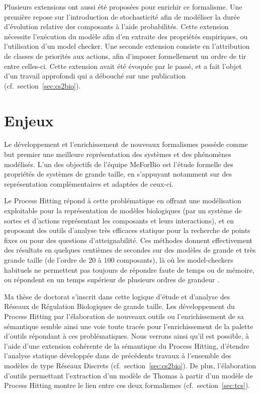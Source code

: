Plusieurs extensions ont aussi été proposées pour enrichir ce formalisme.
Une première repose sur l'introduction de stochasticité afin de modéliser la durée d'évolution relative des composants à l'aide probabilités.
Cette extension nécessite l'exécution du modèle afin d'en extraite des propriétés empiriques, ou l'utilisation d'un model checker.
Une seconde extension consiste en l'attribution de classes de priorités aux actions, afin d'imposer formellement un ordre de tir entre celles-ci.
Cette extension avait été évoquée par le passé, et a fait l'objet d'un travail approfondi qui a débouché sur une publication (cf.~section~\ref{sec:cs2bio}).



\section{Enjeux}

Le développement et l'enrichissement de nouveaux formalismes possède comme but premier une meilleure représentation des systèmes et des phénomènes modélisés.
L'un des objectifs de l'équipe MeForBio est l'étude formelle des propriétés de systèmes de grande taille,
en s'appuyant notamment sur des représentation complémentaires et adaptées de ceux-ci.

Le Process Hitting répond à cette problématique en offrant une modélisation exploitable pour la représentation de modèles biologiques (par un système de sortes et d'actions représentant les composants et leurs interactions),
et en proposant des outils d'analyse très efficaces statique pour la recherche de points fixes ou pour des questions d'atteignabilité.
Ces méthodes donnent effectivement des résultats en quelques centièmes de secondes sur des modèles de grande et très grande taille (de l'ordre de 20 à 100 composants), là où les model-checkers habituels ne permettent pas toujours de répondre faute de temps ou de mémoire, ou répondent en un temps supérieur de plusieurs ordres de grandeur \cite{PMR12-MSCS}.

Ma thèse de doctorat s'inscrit dans cette logique d'étude et d'analyse des Réseaux de Régulation Biologiques de grande taille.
Les développement du Process Hitting par l'élaboration de nouveaux outils ou l'enrichissement de sa sémantique semble ainsi une voie toute tracée pour l'enrichissement de la palette d'outils répondant à ces problématiques.
Nous verrons ainsi qu'il est possible, à l'aide d'une extension cohérente de la sémantique du Process Hitting, d'étendre l'analyse statique développée dans de précédents travaux à l'ensemble des modèles de type Réseaux Discrets (cf.~section~\ref{sec:cs2bio}).
De plus, l'élaboration d'outils permettant l'extraction d'un modèle de Thomas à partir d'un modèle de Process Hitting montre le lien entre ces deux formalismes (cf.~section~\ref{sec:tcs}).

